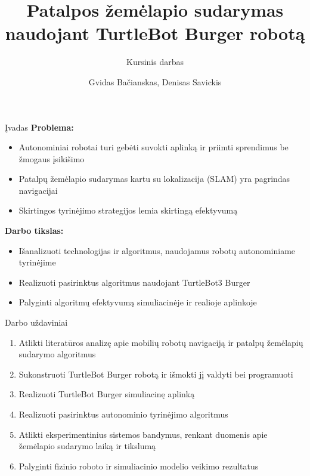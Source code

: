 \documentclass[12pt]{beamer}
\title[]{Patalpos žemėlapio sudarymas naudojant TurtleBot Burger robotą}
\subtitle[]{Kursinis darbas}
\author[Gvidas Bačianskas, Denisas Savickis]{Gvidas Bačianskas, Denisas Savickis}
\date{}
\begin{document}
\begin{frame}
    \titlepage
\end{frame}

\begin{frame}{Įvadas}
    \textbf{Problema:}
    \begin{itemize}
        \item Autonominiai robotai turi gebėti suvokti aplinką ir priimti sprendimus be žmogaus įsikišimo
        \item Patalpų žemėlapio sudarymas kartu su lokalizacija (SLAM) yra pagrindas navigacijai
        \item Skirtingos tyrinėjimo strategijos lemia skirtingą efektyvumą
    \end{itemize}
    
    \vspace{0.5cm}
    \textbf{Darbo tikslas:}
    \begin{itemize}
        \item Išanalizuoti technologijas ir algoritmus, naudojamus robotų autonominiame tyrinėjime
        \item Realizuoti pasirinktus algoritmus naudojant TurtleBot3 Burger
        \item Palyginti algoritmų efektyvumą simuliacinėje ir realioje aplinkoje
    \end{itemize}
\end{frame}

\begin{frame}{Darbo uždaviniai}
    \begin{enumerate}
        \item Atlikti literatūros analizę apie mobilių robotų navigaciją ir patalpų žemėlapių sudarymo algoritmus
        \item Sukonstruoti TurtleBot Burger robotą ir išmokti jį valdyti bei programuoti
        \item Realizuoti TurtleBot Burger simuliacinę aplinką
        \item Realizuoti pasirinktus autonominio tyrinėjimo algoritmus
        \item Atlikti eksperimentinius sistemos bandymus, renkant duomenis apie žemėlapio sudarymo laiką ir tikslumą
        \item Palyginti fizinio roboto ir simuliacinio modelio veikimo rezultatus
    \end{enumerate}
\end{frame}
\end{document}
